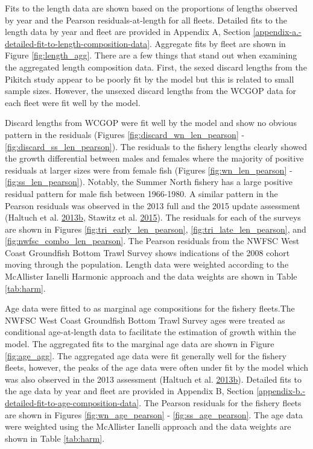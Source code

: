 \documentclass[12pt,]{article}
\begin{document}
Fits to the length data are shown based on the proportions of lengths
observed by year and the Pearson residuals-at-length for all fleets.
Detailed fits to the length data by year and fleet are provided in
Appendix A, Section
\ref{appendix-a.-detailed-fit-to-length-composition-data}. Aggregate
fits by fleet are shown in Figure \ref{fig:length_agg}. There are a few
things that stand out when examining the aggregated length composition
data. First, the sexed discard lengths from the Pikitch study appear to
be poorly fit by the model but this is related to small sample sizes.
However, the unsexed discard lengths from the WCGOP data for each fleet
were fit well by the model.

Discard lengths from WCGOP were fit well by the model and show no
obvious pattern in the residuals (Figures
\ref{fig:discard_wn_len_pearson} - \ref{fig:discard_ss_len_pearson}).
The residuals to the fishery lengths clearly showed the growth
differential between males and females where the majority of positive
residuals at larger sizes were from female fish (Figures
\ref{fig:wn_len_pearson} - \ref{fig:ss_len_pearson}). Notably, the
Summer North fishery has a large positive residual pattern for male fish
between 1966-1980. A similar pattern in the Pearson residuals was
observed in the 2013 full and the 2015 update assessment (Haltuch et al.
\protect\hyperlink{ref-haltuch_status_2013}{2013}\protect\hyperlink{ref-haltuch_status_2013}{b},
Stawitz et al. \protect\hyperlink{ref-stawitz_stock_2015}{2015}). The
residuals for each of the surveys are shown in Figures
\ref{fig:tri_early_len_pearson}, \ref{fig:tri_late_len_pearson}, and
\ref{fig:nwfsc_combo_len_pearson}. The Pearson residuals from the NWFSC
West Coast Groundfish Bottom Trawl Survey shows indications of the 2008
cohort moving through the population. Length data were weighted
according to the McAllister Ianelli Harmonic approach and the data
weights are shown in Table \ref{tab:harm}.

Age data were fitted to as marginal age compositions for the fishery
fleets.The NWFSC West Coast Groundfish Bottom Trawl Survey ages were
treated as conditional age-at-length data to facilitate the estimation
of growth within the model. The aggregated fits to the marginal age data
are shown in Figure \ref{fig:age_agg}. The aggregated age data were fit
generally well for the fishery fleets, however, the peaks of the age
data were often under fit by the model which was also observed in the
2013 assessment (Haltuch et al.
\protect\hyperlink{ref-haltuch_status_2013}{2013}\protect\hyperlink{ref-haltuch_status_2013}{b}).
Detailed fits to the age data by year and fleet are provided in Appendix
B, Section \ref{appendix-b.-detailed-fit-to-age-composition-data}. The
Pearson residuals for the fishery fleets are shown in Figures
\ref{fig:wn_age_pearson} - \ref{fig:ss_age_pearson}. The age data were
weighted using the McAllister Ianelli approach and the data weights are
shown in Table \ref{tab:harm}.
\end{document}
